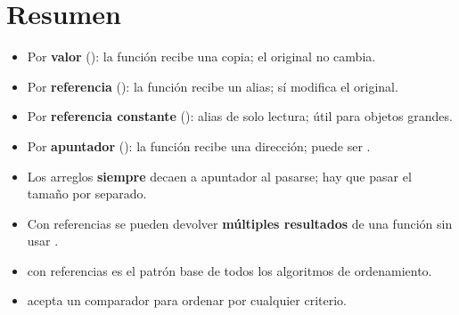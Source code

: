 \documentclass[12pt, oneside]{article}
\begin{document}
\section{Resumen}

\begin{recuerda}
\begin{itemize}
  \item Por \textbf{valor} (): la función recibe una copia; el original no cambia.
  \item Por \textbf{referencia} (): la función recibe un alias; sí modifica el original.
  \item Por \textbf{referencia constante} (): alias de solo lectura; útil para objetos grandes.
  \item Por \textbf{apuntador} (): la función recibe una dirección; puede ser .
  \item Los arreglos \textbf{siempre} decaen a apuntador al pasarse; hay que pasar el tamaño por separado.
  \item Con referencias se pueden devolver \textbf{múltiples resultados} de una función sin usar .
  \item {} con referencias es el patrón base de todos los algoritmos de ordenamiento.
  \item {} acepta un comparador para ordenar por cualquier criterio.
\end{itemize}
\end{recuerda}
\end{document}
